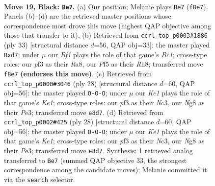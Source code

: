\documentclass[11pt]{article}
\begin{document}
\clearpage

\begin{figure}[p]\centering
\begin{subfigure}{0.46\textwidth}\centering
\resizebox{\linewidth}{!}{%
\newchessgame
\chessboard[
  setfen={r1b1kbnr/p5pp/2pB4/5p2/2N5/3B1P1P/PPP3P1/R2R2K1 b - - 0 19},
  showmover=false,
  pgfstyle=straightmove, color=movearrow, markmove={f8-e7}
]}
\caption{}
\end{subfigure}\hfill
\begin{subfigure}{0.46\textwidth}\centering
\resizebox{\linewidth}{!}{%
\newchessgame
\chessboard[
  setfen={r1b4r/pp1Bkppp/5b2/3p4/3B4/5NP1/PP2PP1P/2KR3R b - - 0 17},
  showmover=false,
  pgfstyle=straightmove, color=movearrow, markmove={c8-d7}
]}
\caption{}
\end{subfigure}
\\[4pt]
\begin{subfigure}{0.46\textwidth}\centering
\resizebox{\linewidth}{!}{%
\newchessgame
\chessboard[
  setfen={r2r2k1/ppp2p1p/6p1/4n3/2P5/P1NbP3/1P3PPP/R3KB1R w KQ - 3 15},
  showmover=false,
  pgfstyle=straightmove, color=movearrow, markmove={e1-c1}
]}
\caption{}
\end{subfigure}\hfill
\begin{subfigure}{0.46\textwidth}\centering
\resizebox{\linewidth}{!}{%
\newchessgame
\chessboard[
  setfen={r2r2k1/ppp2p1p/6p1/4n3/2P5/P1NbP3/1P3PPP/R3KB1R w KQ - 3 15},
  showmover=false,
  pgfstyle=straightmove, color=movearrow, markmove={e1-c1}
]}
\caption{}
\end{subfigure}
\caption{\textbf{Move 19, Black: \texttt{Be7}.} (a) Our position; Melanie plays \texttt{Be7} (\texttt{f8e7}). Panels (b)--(d) are the retrieved master positions whose correspondence most drove this move (highest QAP objective among those that transfer to it). (b) Retrieved from \texttt{ccrl\_top\_p0003\#1886} (ply 33) [structural distance $d$=56, QAP obj=33]: the master played \texttt{Bxd7}; under $\mu$ our \emph{Bf1} plays the role of that game's \emph{Bc1}; cross-type roles: our \emph{p}f3 as their \emph{R}a8, our \emph{P}f5 as their \emph{R}h8; transferred move \texttt{f8e7} \textbf{(endorses this move)}. (c) Retrieved from \texttt{ccrl\_top\_p0000\#3046} (ply 28) [structural distance $d$=60, QAP obj=56]: the master played \texttt{O-O-O}; under $\mu$ our \emph{Ke1} plays the role of that game's \emph{Ke1}; cross-type roles: our \emph{p}f3 as their \emph{N}c3, our \emph{N}g8 as their \emph{P}e3; transferred move \texttt{e8d7}. (d) Retrieved from \texttt{ccrl\_top\_p0002\#425} (ply 28) [structural distance $d$=60, QAP obj=56]: the master played \texttt{O-O-O}; under $\mu$ our \emph{Ke1} plays the role of that game's \emph{Ke1}; cross-type roles: our \emph{p}f3 as their \emph{N}c3, our \emph{N}g8 as their \emph{P}e3; transferred move \texttt{e8d7}. Synthesis: 1 retrieved analog transferred to \texttt{Be7} (summed QAP objective 33, the strongest correspondence among the candidate moves); Melanie committed it via the \texttt{search} selector.}
\label{fig:thought-m37}
\end{figure}
\end{document}

